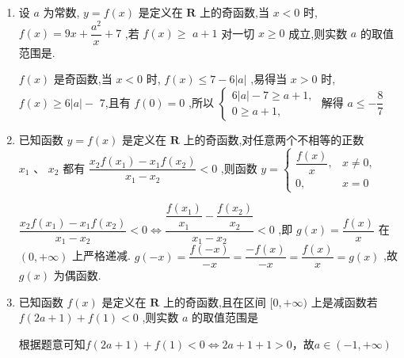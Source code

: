 \begin{enumerate}
    \item 设 $a$ 为常数, $y = f\left( x\right)$ 是定义在 $\mathbf{R}$ 上的奇函数,当 $x < 0$ 时, $f\left( x\right)  = {9x} + \dfrac{{a}^{2}}{x} + 7$ ,若 $f\left( x\right)  \geq$  $a + 1$ 对一切 $x \geq  0$ 成立,则实数 $a$ 的取值范围是\blkda[4]{$\left(-\infty, - \dfrac{8}{7}\right]$}.
    \begin{jieda}
        $f\left( x\right)$ 是奇函数,当 $x < 0$ 时, $f\left( x\right)  \leq  7 - 6\left| a\right|$ ,易得当 $x > 0$ 时, $f\left( x\right)  \geq  6\left| a\right|  -$ 7,且有 $f\left( 0\right)  = 0$ ,所以 $\left\{  \begin{array}{l} 6\left| a\right|  - 7 \geq  a + 1, \\  0 \geq  a + 1, \end{array}\right.$ 解得 $a \leq   - \dfrac{8}{7}$ 
    \end{jieda}
    \item 已知函数 $y = f\left( x\right)$ 是定义在 $\mathbf{R}$ 上的奇函数,对任意两个不相等的正数 ${x}_{1}\text{ 、 }{x}_{2}$ 都有 $\dfrac{{x}_{2}f\left( {x}_{1}\right)  - {x}_{1}f\left( {x}_{2}\right) }{{x}_{1} - {x}_{2}} < 0$ ,则函数 $y = \left\{  \begin{array}{ll} \dfrac{f\left( x\right) }{x}, & x \neq  0, \\  0, & x = 0 \end{array}\right.$ 
    \begin{jieda}
        $\dfrac{{x}_{2}f\left( {x}_{1}\right)  - {x}_{1}f\left( {x}_{2}\right) }{{x}_{1} - {x}_{2}} < 0 \Longleftrightarrow \dfrac{\dfrac{f(x_1)}{x_1} - \dfrac{f(x_2)}{x_2}}{x_1-x_2} < 0$ ,即 $g\left( x\right)  = \dfrac{f\left( x\right) }{x}$ 在 $\left( {0, + \infty }\right)$ 上严格递减. $g\left( {-x}\right)  = \dfrac{f\left( {-x}\right) }{-x} = \dfrac{-f\left( x\right) }{-x} = \dfrac{f\left( x\right) }{x} = g\left( x\right)$ ,故 $g\left( x\right)$ 为偶函数.
    \end{jieda}
    
    \item 已知函数 $f\left( x\right)$ 是定义在 $\mathbf{R}$ 上的奇函数,且在区间 $\lbrack 0, + \infty )$ 上是减函数若 $f\left( {{2a} + 1}\right)  + f\left( 1\right)  < 0$ ,则实数 $a$ 的取值范围是
    \begin{jieda}
        根据题意可知$f\left( {{2a} + 1}\right)  + f\left( 1\right)  < 0 \Longleftrightarrow 2a+1+1 > 0$，故$a \in \left( {-1, + \infty }\right)$
    \end{jieda}
    

\end{enumerate}
